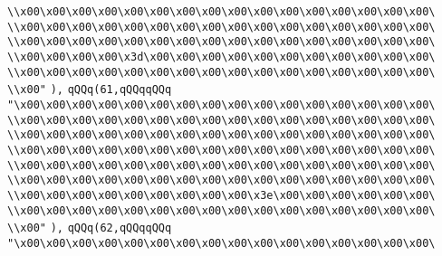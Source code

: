 \verb|\\x00\x00\x00\x00\x00\x00\x00\x00\x00\x00\x00\x00\x00\x00\x00\x00\|\newline
\verb|\\x00\x00\x00\x00\x00\x00\x00\x00\x00\x00\x00\x00\x00\x00\x00\x00\|\newline
\verb|\\x00\x00\x00\x00\x00\x00\x00\x00\x00\x00\x00\x00\x00\x00\x00\x00\|\newline
\verb|\\x00\x00\x00\x00\x3d\x00\x00\x00\x00\x00\x00\x00\x00\x00\x00\x00\|\newline
\verb|\\x00\x00\x00\x00\x00\x00\x00\x00\x00\x00\x00\x00\x00\x00\x00\x00\|\newline
\verb|\\x00"|\newline
\verb|),|\newline
\verb|qQQq(61,qQQqqQQq|\newline
\verb|"\x00\x00\x00\x00\x00\x00\x00\x00\x00\x00\x00\x00\x00\x00\x00\x00\|\newline
\verb|\\x00\x00\x00\x00\x00\x00\x00\x00\x00\x00\x00\x00\x00\x00\x00\x00\|\newline
\verb|\\x00\x00\x00\x00\x00\x00\x00\x00\x00\x00\x00\x00\x00\x00\x00\x00\|\newline
\verb|\\x00\x00\x00\x00\x00\x00\x00\x00\x00\x00\x00\x00\x00\x00\x00\x00\|\newline
\verb|\\x00\x00\x00\x00\x00\x00\x00\x00\x00\x00\x00\x00\x00\x00\x00\x00\|\newline
\verb|\\x00\x00\x00\x00\x00\x00\x00\x00\x00\x00\x00\x00\x00\x00\x00\x00\|\newline
\verb|\\x00\x00\x00\x00\x00\x00\x00\x00\x00\x3e\x00\x00\x00\x00\x00\x00\|\newline
\verb|\\x00\x00\x00\x00\x00\x00\x00\x00\x00\x00\x00\x00\x00\x00\x00\x00\|\newline
\verb|\\x00"|\newline
\verb|),|\newline
\verb|qQQq(62,qQQqqQQq|\newline
\verb|"\x00\x00\x00\x00\x00\x00\x00\x00\x00\x00\x00\x00\x00\x00\x00\x00\|\newline
